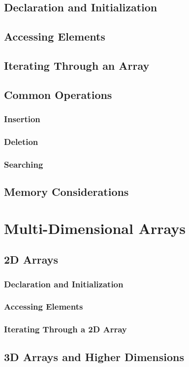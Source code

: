 \documentclass[12pt, oneside]{book}
\begin{document}
	\subsection{Declaration and Initialization}
	\subsection{Accessing Elements}
	\subsection{Iterating Through an Array}
	\subsection{Common Operations}
	\subsubsection{Insertion}
	\subsubsection{Deletion}
	\subsubsection{Searching}
	\subsection{Memory Considerations}
	\section{Multi-Dimensional Arrays}
	\subsection{2D Arrays}
	\subsubsection{Declaration and Initialization}
	\subsubsection{Accessing Elements}
	\subsubsection{Iterating Through a 2D Array}
	\subsection{3D Arrays and Higher Dimensions}
\end{document}
